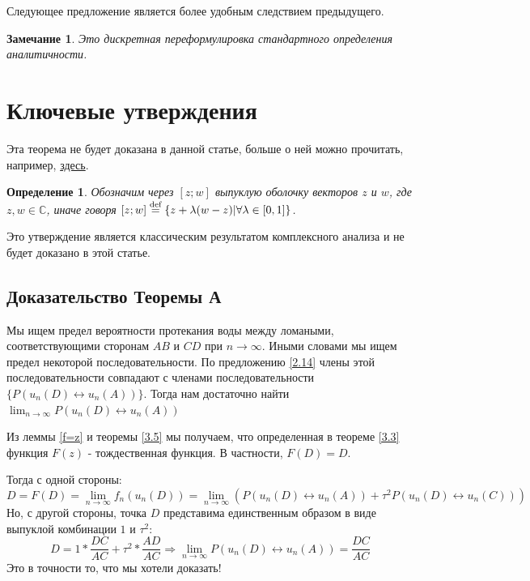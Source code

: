 \documentclass[russian,12pt]{article}
\newtheorem{definition}{Определение}
\newtheorem{note}{Замечание}
\newcommand*{\defeq}{\stackrel{\text{def}}{=}}
\begin{document}


Следующее предложение является более удобным следствием предыдущего.



\begin{note}
Это дискретная переформулировка стандартного определения аналитичности.
\end{note}

\section*{Ключевые утверждения}



Эта теорема не будет доказана в данной статье, больше о ней можно прочитать, например, \href{https://ru.wikipedia.org/wiki/%D0%A2%D0%B5%D0%BE%D1%80%D0%B5%D0%BC%D0%B0_%D0%90%D1%81%D0%BA%D0%BE%D0%BB%D0%B8_%E2%80%94_%D0%90%D1%80%D1%86%D0%B5%D0%BB%D0%B0}{здесь}.





\begin{definition}
Обозначим через $[z;w]$ выпуклую оболочку векторов $z$ и $w$, где  $z,w\in\mathbb{C}$, иначе говоря $[z;w] \defeq \{z + \lambda(w - z) \space | \space \forall \space \lambda \in [0, 1] \}$.
\end{definition}





Это утверждение является классическим результатом комплексного анализа и не будет доказано в этой статье.



\subsection*{Доказательство Теоремы А}
Мы ищем предел вероятности протекания воды между ломаными, соответствующими сторонам $AB$ и $CD$ при $n \to \infty$. Иными словами мы ищем предел некоторой последовательности. По предложению \ref{2.14} члены этой последовательности совпадают с членами последовательности $\{P(u_n(D) \leftrightarrow u_n(A))\}$. Тогда нам достаточно найти  $\lim_{n \to \infty}P(u_n(D) \leftrightarrow u_n(A))$

Из леммы \ref{f=z} и теоремы \ref{3.5} мы получаем, что определенная в теореме \ref{3.3} функция $F(z)$ - тождественная функция. В частности, $F(D) = D$.

Тогда с одной стороны:
$$D = F(D) = \lim_{n \to \infty} f_n(u_n(D)) = \lim_{n \to \infty} \left( P(u_n(D) \leftrightarrow u_n(A)) + \tau^2P(u_n(D) \leftrightarrow u_n(C)) \right)$$
Но, с другой стороны, точка $D$ представима единственным образом в виде выпуклой комбинации $1$ и $\tau^2$: 
$$D = 1*\frac{DC}{AC} + \tau^2*\frac{AD}{AC} \Rightarrow \lim_{n \to \infty}  P(u_n(D) \leftrightarrow u_n(A)) = \frac{DC}{AC}$$
Это в точности то, что мы хотели доказать!
\end{document}

